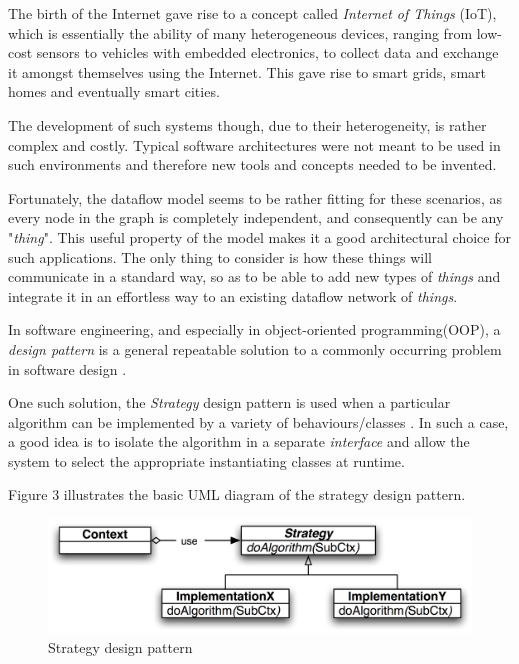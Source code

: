 \documentclass{dithesis}
\begin{document}

The birth of the Internet gave rise to a concept called \textit{Internet of Things} (IoT), which is essentially the ability of many heterogeneous devices, ranging from low-cost sensors to vehicles with embedded electronics, to collect data and exchange it amongst themselves using the Internet. This gave rise to smart grids, smart homes and eventually smart cities. 

The development of such systems though, due to their heterogeneity, is rather complex and costly. Typical software architectures were not meant to be used in such environments and therefore new tools and concepts needed to be invented. 

Fortunately, the dataflow model seems to be rather fitting for these scenarios, as every node in the graph is completely independent, and consequently can be any "\textit{thing}". This useful property of the model makes it a good architectural choice for such applications. The only thing to consider is how these things will communicate in a standard way, so as to be able to add new types of \textit{things} and integrate it in an effortless way to an existing dataflow network of \textit{things}.


In software engineering, and especially in object-oriented programming(OOP), a \textit{design pattern} is a general repeatable solution to a commonly occurring problem in software design \cite{design}.

One such solution, the \textit{Strategy} design pattern is used when a particular algorithm can be implemented by a variety of behaviours/classes \cite{design}. In such a case, a good idea is to isolate the algorithm in a separate \textit{interface} and allow the system to select the appropriate instantiating classes at runtime.

Figure 3 illustrates the basic UML diagram of the strategy design pattern.

\begin{figure}[h!] 
	\centering
	\includegraphics[scale=0.1]{strategy}
  	\caption{Strategy design pattern}
\end{figure}
\end{document}
